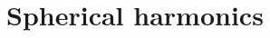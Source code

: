 \documentclass[modern]{aastex61}
\begin{document}
%

%


\pagebreak
\appendix


\section{Spherical harmonics}
\label{app:spharm}
\end{document}
